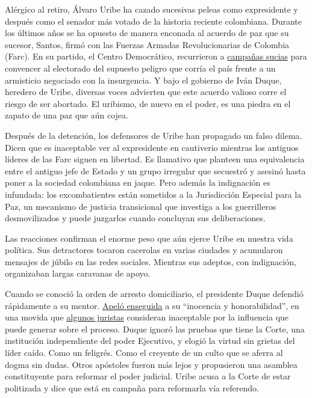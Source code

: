 Alérgico al retiro, Álvaro Uribe ha cazado sucesivas peleas como
expresidente y después como el senador más votado de la historia
reciente colombiana. Durante los últimos años se ha opuesto de manera
enconada al acuerdo de paz que su sucesor, Santos, firmó con las Fuerzas
Armadas Revolucionarias de Colombia (Farc). En su partido, el Centro
Democrático, recurrieron a
\href{https://www.elcolombiano.com/colombia/acuerdos-de-gobierno-y-farc/entrevista-a-juan-carlos-velez-sobre-la-estrategia-de-la-campana-del-no-en-el-plebiscito-CE5116400}{campañas
sucias} para convencer al electorado del supuesto peligro que corría el
país frente a un armisticio negociado con la insurgencia. Y bajo el
gobierno de Iván Duque, heredero de Uribe, diversas voces advierten que
este acuerdo valioso corre el riesgo de ser abortado. El uribismo, de
nuevo en el poder, es una piedra en el zapato de una paz que aún cojea.

Después de la detención, los defensores de Uribe han propagado un falso
dilema. Dicen que es inaceptable ver al expresidente en cautiverio
mientras los antiguos líderes de las Farc siguen en libertad. Es
llamativo que planteen una equivalencia entre el antiguo jefe de Estado
y un grupo irregular que secuestró y asesinó hasta poner a la sociedad
colombiana en jaque. Pero además la indignación es infundada: los
excombatientes están sometidos a la Jurisdicción Especial para la Paz,
un mecanismo de justicia transicional que investiga a los guerrilleros
desmovilizados y puede juzgarlos cuando concluyan sus deliberaciones.

Las reacciones confirman el enorme peso que aún ejerce Uribe en nuestra
vida política. Sus detractores tocaron cacerolas en varias ciudades y
acumularon mensajes de júbilo en las redes sociales. Mientras sus
adeptos, con indignación, organizaban largas caravanas de apoyo.

Cuando se conoció la orden de arresto domiciliario, el presidente Duque
defendió rápidamente a su mentor.
\href{https://twitter.com/IvanDuque/status/1290755832330813442}{Apeló
enseguida} a su ``inocencia y honorabilidad'', en una movida que
\href{https://www.france24.com/es/20200807-colombia-duque-extralimitado-detenci\%C3\%B3n-domiciliaria-uribe}{algunos
juristas} consideran inaceptable por la influencia que puede generar
sobre el proceso. Duque ignoró las pruebas que tiene la Corte, una
institución independiente del poder Ejecutivo, y elogió la virtud sin
grietas del líder caído. Como un feligrés. Como el creyente de un culto
que se aferra al dogma sin dudas. Otros apóstoles fueron más lejos y
propusieron una asamblea constituyente para reformar el poder judicial.
Uribe acusa a la Corte de estar politizada y dice que está en campaña
para reformarla vía referendo.

